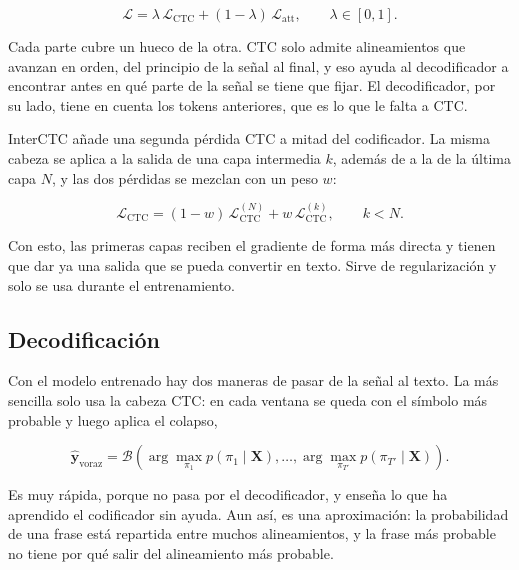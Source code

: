\begin{equation}
  \mathcal{L} = \lambda\, \mathcal{L}_{\mathrm{CTC}} + (1-\lambda)\, \mathcal{L}_{\mathrm{att}}, \qquad \lambda \in [0,1].
  \label{eq:joint-ctc-att}
\end{equation}

Cada parte cubre un hueco de la otra. CTC solo admite alineamientos que avanzan en orden, del principio de la señal al final, y eso ayuda al decodificador a encontrar antes en qué parte de la señal se tiene que fijar. El decodificador, por su lado, tiene en cuenta los tokens anteriores, que es lo que le falta a CTC.

InterCTC \cite{lee2021interctc} añade una segunda pérdida CTC a mitad del codificador. La misma cabeza se aplica a la salida de una capa intermedia $k$, además de a la de la última capa $N$, y las dos pérdidas se mezclan con un peso $w$:

\begin{equation}
  \mathcal{L}_{\mathrm{CTC}} = (1-w)\,\mathcal{L}_{\mathrm{CTC}}^{(N)} + w\, \mathcal{L}_{\mathrm{CTC}}^{(k)}, \qquad k < N.
  \label{eq:interctc}
\end{equation}

Con esto, las primeras capas reciben el gradiente de forma más directa y tienen que dar ya una salida que se pueda convertir en texto. Sirve de regularización y solo se usa durante el entrenamiento.

\subsection{Decodificación}
\label{sec:decodificacion}

Con el modelo entrenado hay dos maneras de pasar de la señal al texto. La más sencilla solo usa la cabeza CTC: en cada ventana se queda con el símbolo más probable y luego aplica el colapso,

\begin{equation}
  \hat{\mathbf{y}}_{\mathrm{voraz}} = \mathcal{B}\left( \arg\max_{\pi_1} p(\pi_1 \mid \mathbf{X}), \dots, \arg\max_{\pi_{T'}} p(\pi_{T'} \mid \mathbf{X}) \right).
  \label{eq:ctc-greedy}
\end{equation}

Es muy rápida, porque no pasa por el decodificador, y enseña lo que ha aprendido el codificador sin ayuda. Aun así, es una aproximación: la probabilidad de una frase está repartida entre muchos alineamientos, y la frase más probable no tiene por qué salir del alineamiento más probable.

